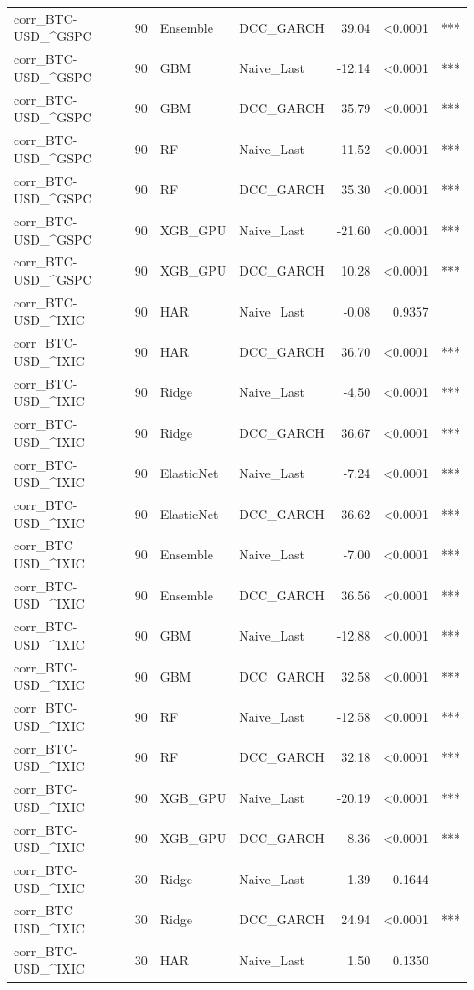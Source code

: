 \begin{table}[H]
\begin{tabular}{llllrrl}
corr_BTC-USD_^GSPC & 90 & Ensemble & DCC_GARCH & 39.04 & <0.0001 & *** \\
corr_BTC-USD_^GSPC & 90 & GBM & Naive_Last & -12.14 & <0.0001 & *** \\
corr_BTC-USD_^GSPC & 90 & GBM & DCC_GARCH & 35.79 & <0.0001 & *** \\
corr_BTC-USD_^GSPC & 90 & RF & Naive_Last & -11.52 & <0.0001 & *** \\
corr_BTC-USD_^GSPC & 90 & RF & DCC_GARCH & 35.30 & <0.0001 & *** \\
corr_BTC-USD_^GSPC & 90 & XGB_GPU & Naive_Last & -21.60 & <0.0001 & *** \\
corr_BTC-USD_^GSPC & 90 & XGB_GPU & DCC_GARCH & 10.28 & <0.0001 & *** \\
corr_BTC-USD_^IXIC & 90 & HAR & Naive_Last & -0.08 & 0.9357 &  \\
corr_BTC-USD_^IXIC & 90 & HAR & DCC_GARCH & 36.70 & <0.0001 & *** \\
corr_BTC-USD_^IXIC & 90 & Ridge & Naive_Last & -4.50 & <0.0001 & *** \\
corr_BTC-USD_^IXIC & 90 & Ridge & DCC_GARCH & 36.67 & <0.0001 & *** \\
corr_BTC-USD_^IXIC & 90 & ElasticNet & Naive_Last & -7.24 & <0.0001 & *** \\
corr_BTC-USD_^IXIC & 90 & ElasticNet & DCC_GARCH & 36.62 & <0.0001 & *** \\
corr_BTC-USD_^IXIC & 90 & Ensemble & Naive_Last & -7.00 & <0.0001 & *** \\
corr_BTC-USD_^IXIC & 90 & Ensemble & DCC_GARCH & 36.56 & <0.0001 & *** \\
corr_BTC-USD_^IXIC & 90 & GBM & Naive_Last & -12.88 & <0.0001 & *** \\
corr_BTC-USD_^IXIC & 90 & GBM & DCC_GARCH & 32.58 & <0.0001 & *** \\
corr_BTC-USD_^IXIC & 90 & RF & Naive_Last & -12.58 & <0.0001 & *** \\
corr_BTC-USD_^IXIC & 90 & RF & DCC_GARCH & 32.18 & <0.0001 & *** \\
corr_BTC-USD_^IXIC & 90 & XGB_GPU & Naive_Last & -20.19 & <0.0001 & *** \\
corr_BTC-USD_^IXIC & 90 & XGB_GPU & DCC_GARCH & 8.36 & <0.0001 & *** \\
corr_BTC-USD_^IXIC & 30 & Ridge & Naive_Last & 1.39 & 0.1644 &  \\
corr_BTC-USD_^IXIC & 30 & Ridge & DCC_GARCH & 24.94 & <0.0001 & *** \\
corr_BTC-USD_^IXIC & 30 & HAR & Naive_Last & 1.50 & 0.1350 &  \\

\end{tabular}
\end{table}
